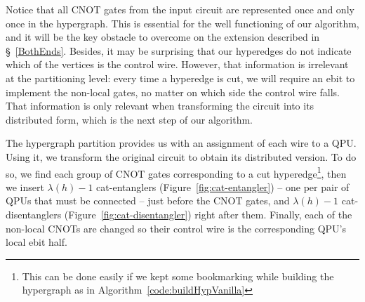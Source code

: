 Notice that all CNOT gates from the input circuit are represented once and only once in the hypergraph. This is essential for the well functioning of our algorithm, and it will be the key obstacle to overcome on the extension described in \S~\ref{BothEnds}. Besides, it may be surprising that our hyperedges do not indicate which of the vertices is the control wire. However, that information is irrelevant at the partitioning level: every time a hyperedge is cut, we will require an ebit to implement the non-local gates, no matter on which side the control wire falls. That information is only relevant when transforming the circuit into its distributed form, which is the next step of our algorithm. 

The hypergraph partition provides us with an assignment of each wire to a QPU. Using it, we transform the original circuit to obtain its distributed version. To do so, we find each group of CNOT gates corresponding to a cut hyperedge\footnote{This can be done easily if we kept some bookmarking while building the hypergraph as in Algorithm~\ref{code:buildHypVanilla}}, then we insert \(\lambda(h)-1\) cat-entanglers (Figure~\ref{fig:cat-entangler}) -- one per pair of QPUs that must be connected -- just before the CNOT gates, and \(\lambda(h)-1\) cat-disentanglers (Figure~\ref{fig:cat-disentangler}) right after them. Finally, each of the non-local CNOTs are changed so their control wire is the corresponding QPU's local ebit half.


\begin{comment}
\begin{algorithm}[caption={Algorithm for distributing a circuit using an assignment \(qpuOf \colon \mathbb{N} \to \mathbb{N}\) which indicates the QPU number of the given wire},label={code:distribution}]
input: circuit, $qpuOf$
output: distributed
begin
  distributed $\gets$ $emptyCircuit$
  foreach wire in circuit do
    thisQPU = $qpuOf$(wire)
    activeConnections $\gets$ $\varnothing$
    foreach gate in wire do
      if gate == CNOT and $controlOf$(gate) == wire then
        targetQPU = $qpuOf$($targetOf$(gate))
        if targetQPU == thisQPU then
          distributed.$addCNOTAt$(wire,target)
        else
          ebit $\gets$ activeConnections.$at$(targetQPU)
          if ebit == null then
            ebit $\gets$ $distillEbit$(thisQPU, targetQPU)
            distributed.$addCatEntangler$(ebit, wire)
            activeConnections.$at$(targetQPU) $\gets$ ebit
          distributed.$addCNOTAt$(ebit,$targetOf$(gate))
      else
        distributed.$addGateAt$(gate,wire)
end
\end{algorithm}
\end{comment}


